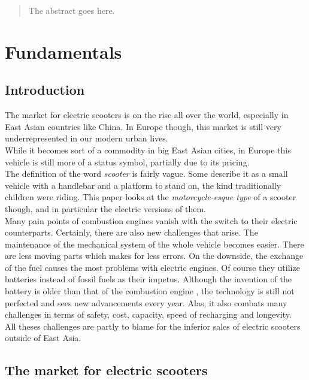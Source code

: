 \documentclass[12pt,a4paper]{report}
\begin{document}



\begin{abstract}

The abstract goes here.

\end{abstract}


\tableofcontents


\chapter{Fundamentals} \label{chap:intro}


\section{Introduction}

The market for electric scooters is on the rise all over the world,
especially in East Asian countries like China. \cn
In Europe though, this market is still very underrepresented in our modern urban lives.\\
While it becomes sort of a commodity in big East Asian cities, in Europe this vehicle
is still more of a status symbol, partially due to its pricing.\cn \\
The definition of the word \emph{scooter} is fairly vague.
Some describe it as a small vehicle with a handlebar and a platform to stand on,
the kind traditionally children were riding.
This paper looks at the \emph{motorcycle-esque type} of a scooter though, and in
particular the electric versions of them.\\
Many pain points of combustion engines vanish with the switch to their electric
counterparts. Certainly, there are also new challenges that arise.
The maintenance of the mechanical system of the whole vehicle becomes easier.
There are less moving parts which makes for less errors.
On the downside, the exchange of the fuel causes the most problems with electric engines.
Of course they utilize batteries instead of fossil fuels as their impetus.
Although the invention of the battery is older than that of the
combustion engine \cn, the technology is still not perfected and sees new
advancements every year. Alas, it also combats many challenges in terms of
safety, cost, capacity, speed of recharging and longevity.\\
All theses challenges are partly to blame for the inferior sales of electric scooters
outside of East Asia. \cn


\section{The market for electric scooters}
\end{document}
